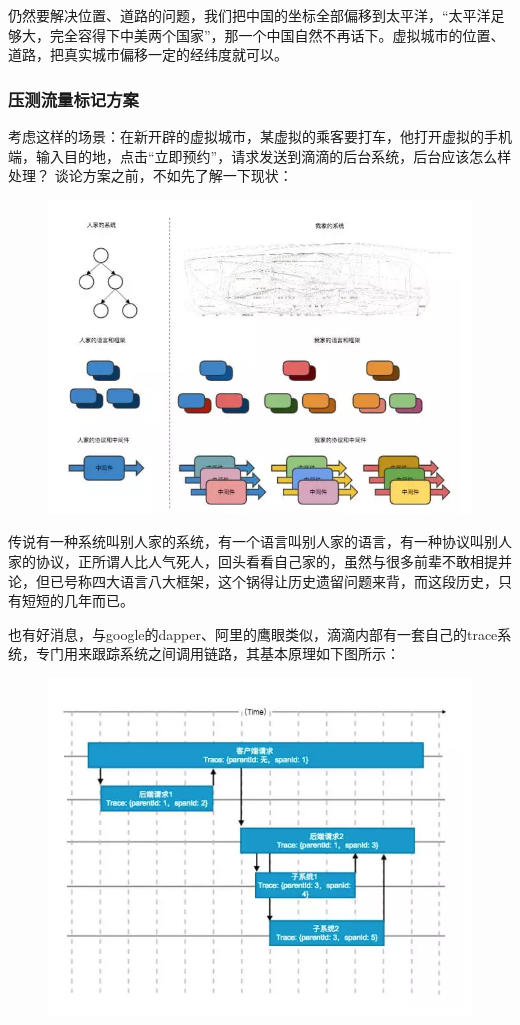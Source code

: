 \documentclass[12pt]{article}
\begin{document}
仍然要解决位置、道路的问题，我们把中国的坐标全部偏移到太平洋，“太平洋足够大，完全容得下中美两个国家”，那一个中国自然不再话下。虚拟城市的位置、道路，把真实城市偏移一定的经纬度就可以。

\subsubsection{压测流量标记方案}
考虑这样的场景：在新开辟的虚拟城市，某虚拟的乘客要打车，他打开虚拟的手机端，输入目的地，点击“立即预约”，请求发送到滴滴的后台系统，后台应该怎么样处理？ 谈论方案之前，不如先了解一下现状：
\begin{figure}[H]
    \centering
    \includegraphics[width=1\textwidth]{fig/DIDI_Pressure_4.png}
\end{figure}

传说有一种系统叫别人家的系统，有一个语言叫别人家的语言，有一种协议叫别人家的协议，正所谓人比人气死人，回头看看自己家的，虽然与很多前辈不敢相提并论，但已号称四大语言八大框架，这个锅得让历史遗留问题来背，而这段历史，只有短短的几年而已。

也有好消息，与google的dapper、阿里的鹰眼类似，滴滴内部有一套自己的trace系统，专门用来跟踪系统之间调用链路，其基本原理如下图所示：
\begin{figure}[H]
    \centering
    \includegraphics[width=1\textwidth]{fig/DIDI_Pressure_5.png}
\end{figure}
\end{document}
